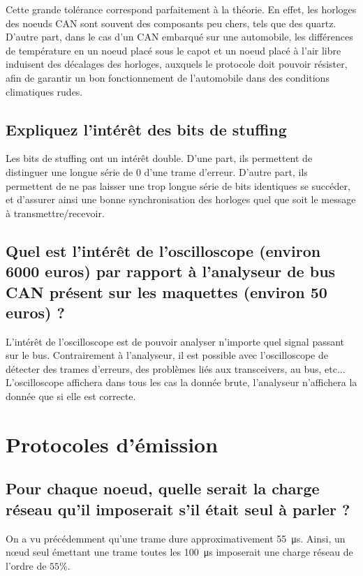 \documentclass[12pt]{article}
\begin{document}
Cette grande tolérance correspond parfaitement à la théorie. En effet, les horloges des noeuds CAN sont souvent des composants peu chers, tels que des quartz. D'autre part, dans le cas d'un CAN embarqué sur une automobile, les différences de température en un noeud placé sous le capot et un noeud placé à l'air libre induisent des décalages des horloges, auxquels le protocole doit pouvoir résister, afin de garantir un bon fonctionnement de l'automobile dans des conditions climatiques rudes.

\subsection{Expliquez l'intérêt des bits de stuffing}

Les bits de stuffing ont un intérêt double. D'une part, ils permettent de distinguer une longue série de 0 d'une trame d'erreur. D'autre part, ils permettent de ne pas laisser une trop longue série de bits identiques se succéder, et d'assurer ainsi une bonne synchronisation des horloges quel que soit le message à transmettre/recevoir.

\subsection{Quel est l'intérêt de l'oscilloscope (environ 6000 euros) par rapport à l'analyseur de bus CAN présent sur les maquettes (environ 50 euros) ?}

L'intérêt de l'oscilloscope est de pouvoir analyser n'importe quel signal passant sur le bus. Contrairement à l'analyseur, il est possible avec l'oscilloscope de détecter des trames d'erreurs, des problèmes liés aux transceivers, au bus, etc... L'oscilloscope affichera dans tous les cas la donnée brute, l'analyseur n'affichera la donnée que si elle est correcte.

\section{Protocoles d'émission}

\subsection{Pour chaque noeud, quelle serait la charge réseau qu'il imposerait s'il était seul à parler ?}

On a vu précédemment qu'une trame dure approximativement \SI{55}{\micro\second}. Ainsi, un nœud seul émettant une trame toutes les \SI{100}{\micro\second} imposerait une charge réseau de l'ordre de $55\%$.
\end{document}
